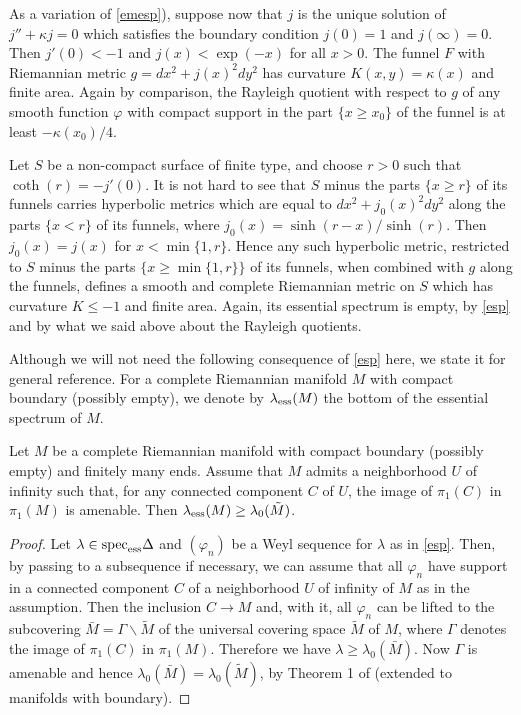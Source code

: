 \begin{exas}
\begin{inparaenum}[1)]
\item\label{emesp2}
As a variation of \ref{emesp}),
suppose now that $j$ is the unique solution of $j''+\kappa j=0$
which satisfies the boundary condition $j(0)=1$ and $j(\infty)=0$.
Then $j'(0)<-1$ and $j(x)<\exp(-x)$ for all $x>0$.
The funnel $F$ with Riemannian metric $g=dx^2+j(x)^2dy^2$
has curvature $K(x,y)=\kappa(x)$ and finite area.
Again by comparison, the Rayleigh quotient with respect to $g$
of any smooth function ${\varphi}$ with compact support in the part $\{x\ge x_0\}$
of the funnel is at least $-\kappa(x_0)/4$.

Let $S$ be a non-compact surface of finite type,
and choose $r>0$ such that $\coth(r)=-j'(0)$.
It is not hard to see that $S$ minus the parts $\{x\ge r\}$ of its funnels
carries hyperbolic metrics which are equal to $dx^2+j_0(x)^2dy^2$
along the parts $\{x<r\}$ of its funnels, where $j_0(x)=\sinh(r-x)/\sinh(r)$.
Then $j_0(x)=j(x)$ for $x<\min\{1,r\}$.
Hence any such hyperbolic metric,
restricted to $S$ minus the parts $\{x\ge\min\{1,r\}\}$ of its funnels,
when combined with $g$ along the funnels,
defines a smooth and complete Riemannian metric on $S$
which has curvature $K\le-1$ and finite area.
Again, its essential spectrum is empty,
by \cref{esp} and by what we said above about the Rayleigh quotients.
\end{inparaenum}
\end{exas}

Although we will not need the following consequence of \cref{esp} here,
we state it for general reference.
For a complete Riemannian manifold $M$  with compact boundary (possibly empty),
we denote by $\lambda_{\rm ess}(M)$ the bottom of the essential spectrum of $M$.

\begin{cor}\label{esp2}
Let $M$ be a complete Riemannian manifold with compact boundary (possibly empty)
and finitely many ends.
Assume that $M$ admits a neighborhood $U$ of infinity such that,
for any connected component $C$ of $U$,
the image of $\pi_1(C)$ in $\pi_1(M)$ is amenable.
Then $\lambda_{\rm ess}(M)\ge\lambda_0(\tilde M)$.
\end{cor}

\begin{proof}
Let $\lambda\in{\operatorname{spec}}_{\rm ess}\Delta$ and $({\varphi}_n)$
be a Weyl sequence for $\lambda$ as in \cref{esp}.
Then, by passing to a subsequence if necessary,
we can assume that all ${\varphi}_n$ have support in a connected component $C$
of a neighborhood $U$ of infinity of $M$ as in the assumption.
Then the inclusion $C\to M$ and, with it, all ${\varphi}_n$ can be lifted
to the subcovering $\bar M=\Gamma\backslash\tilde M$
of the universal covering space $\tilde M$ of $M$,
where $\Gamma$ denotes the image of $\pi_1(C)$ in $\pi_1(M)$.
Therefore we have $\lambda\ge\lambda_0(\bar M)$.
Now $\Gamma$ is amenable
and hence $\lambda_0(\bar M)=\lambda_0(\tilde M)$,
by Theorem 1 of \cite{Br2} (extended to manifolds with boundary).
\end{proof}

